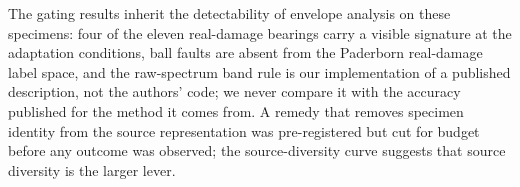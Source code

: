 The gating results inherit the detectability of envelope analysis on these specimens: four of the eleven real-damage bearings
carry a visible signature at the adaptation conditions, ball faults are absent from the Paderborn real-damage label space, and
the raw-spectrum band rule is our implementation of a published description, not the authors' code; we never compare it with
the accuracy published for the method it comes from. A remedy that removes specimen identity from the source representation
was pre-registered but cut for budget before any outcome was observed; the source-diversity curve suggests that source
diversity is the larger lever.
